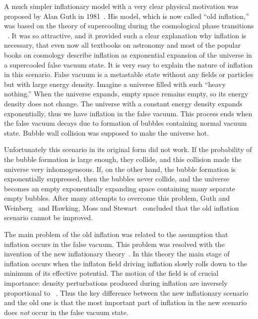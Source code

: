 \documentclass[a4paper,12pt]{article}
\begin{document}
A much simpler inflationary model with a very clear physical motivation was proposed
by Alan Guth  in 1981~\cite{Guth}.  His model, which is now called ``old
inflation,'' was based on the theory of supercooling during the
cosmological phase transitions ~\cite{Kirzhnits}. It was so attractive, and it provided such a clear explanation why inflation is necessary,
that even now all textbooks on astronomy and most of the popular books
on cosmology  describe   inflation as   exponential expansion of the
universe in a supercooled false vacuum state. It is very easy to
explain the nature of inflation in this scenario. False vacuum is a
metastable state without any fields or particles but with large  energy
density. Imagine a universe filled with such ``heavy nothing.'' When the
universe expands, empty space remains empty, so its energy density does
not change. The universe with a constant energy density expands
exponentially, thus we have inflation in the false vacuum. This process ends when the false vacuum decays due to formation of bubbles containing normal vacuum state. Bubble wall collision was supposed to make the universe hot.

Unfortunately this scenario in its original form did not work. If the probability 
of the bubble formation is large enough, they collide, and this collision made the universe very inhomogeneous. If, on the other hand, the bubble formation is exponentially suppressed, then the bubbles never collide, and the universe becomes an empty exponentially expanding space containing many separate empty bubbles.  After many attempts to overcome this problem, Guth and Weinberg~\cite{GW} and Hawking,  Moss and  Stewart~\cite{HMS}  concluded that the old   inflation scenario
cannot be improved.

The main problem of the old inflation was related to the assumption that inflation occurs in the false vacuum.  This problem was resolved with the invention of the new
inflationary theory~\cite{New}. In this theory the main stage of inflation occurs  when the inflaton field \myHighlight{$\phi$}\coordHE{} driving inflation  slowly rolls down to the minimum of its effective potential.  The motion of the field is of crucial importance: density perturbations produced during inflation   are inversely proportional to \myHighlight{$\dot \phi$}\coordHE{}~\cite{Mukh,Hawk}. Thus the key difference between the new inflationary scenario and the old one is that the most important part of inflation in the new scenario does {\it not} occur in the false vacuum state.
\end{document}
